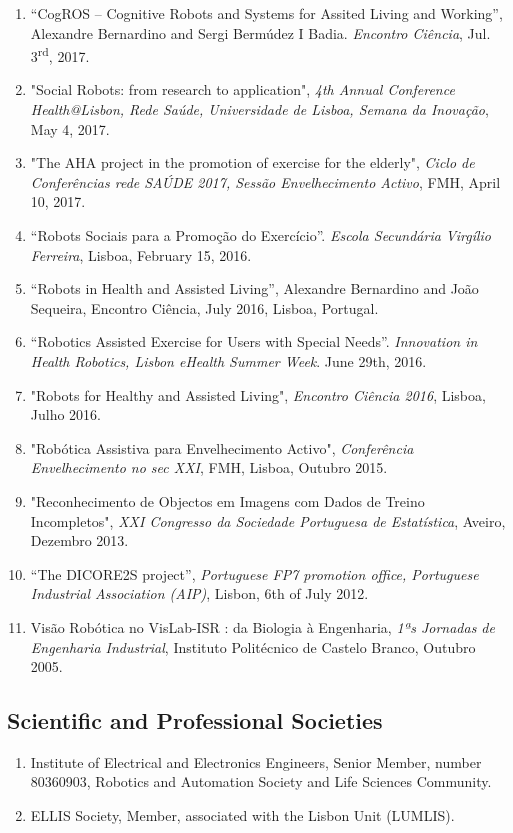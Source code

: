 \documentclass[
]{article}
\begin{document}
\begin{enumerate}
  Parkinson'', \emph{Congresso CNS}, April 7, 2018, Torres Vedras,
  Portugal.
\item
  ``CogROS -- Cognitive Robots and Systems for Assited Living and
  Working'', Alexandre Bernardino and Sergi Bermúdez I Badia.
  \emph{Encontro Ciência}, Jul. 3\textsuperscript{rd}, 2017.
\item
  "Social Robots: from research to application", \emph{4th Annual
  Conference Health@Lisbon, Rede Saúde, Universidade de Lisboa, Semana
  da Inovação}, May 4, 2017.~
\item
  "The AHA project in the promotion of exercise for the elderly",
  \emph{Ciclo de Conferências rede SAÚDE 2017, Sessão Envelhecimento
  Activo}, FMH, April 10, 2017.
\item
  ``Robots Sociais para a Promoção do Exercício''. \emph{Escola
  Secundária Virgílio Ferreira}, Lisboa, February 15, 2016.~
\item
  ``Robots in Health and Assisted Living'', Alexandre Bernardino and
  João Sequeira, Encontro Ciência, July 2016, Lisboa, Portugal.
\item
  ``Robotics Assisted Exercise for Users with Special Needs''.
  \emph{Innovation in Health Robotics, Lisbon eHealth Summer Week}. June
  29th, 2016.
\item
  "Robots for Healthy and Assisted Living", \emph{Encontro Ciência
  2016}, Lisboa, Julho 2016.
\item
  "Robótica Assistiva para Envelhecimento Activo", \emph{Conferência
  Envelhecimento no sec XXI}, FMH, Lisboa, Outubro 2015.
\item
  "Reconhecimento de Objectos em Imagens com Dados de Treino
  Incompletos", \emph{XXI Congresso da Sociedade Portuguesa de
  Estatística}, Aveiro, Dezembro 2013.
\item
  ``The DICORE2S project'', \emph{Portuguese FP7 promotion office,
  Portuguese Industrial Association (AIP)}, Lisbon, 6th of July 2012.
\item
  Visão Robótica no VisLab-ISR : da Biologia à Engenharia, \emph{1ªs
  Jornadas de Engenharia Industrial}, Instituto Politécnico de Castelo
  Branco, Outubro 2005.
\end{enumerate}

\subsection{Scientific and Professional
Societies}\label{scientific-and-professional-societies}

\begin{enumerate}
\def\labelenumi{\arabic{enumi}.}
\item
  Institute of Electrical and Electronics Engineers, Senior Member,
  number 80360903, Robotics and Automation Society and Life Sciences
  Community.
\item
  ELLIS Society, Member, associated with the Lisbon Unit (LUMLIS).
\end{enumerate}
\end{document}
